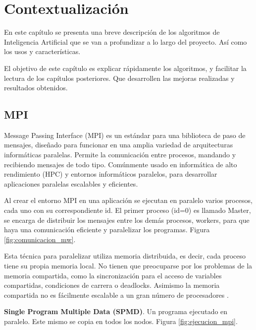 \chapter{Contextualización}
\label{cap:Contextualizacion}



En este capítulo se presenta una breve descripción de los algoritmos de Inteligencia Artificial que se van a profundizar a lo largo del proyecto. Así como los usos y características. 

El objetivo de este capítulo es explicar rápidamente los algoritmos, y facilitar la lectura de los capítulos posteriores. Que desarrollen las mejoras realizadas y resultados obtenidos.



\section{MPI}
Message Passing Interface \cite{barker2015message}  (MPI)  es un estándar para una biblioteca de paso de mensajes, diseñado para funcionar en una amplia variedad de arquitecturas informáticas paralelas. Permite la comunicación entre procesos, mandando y recibiendo mensajes de todo tipo. Comúnmente usado en informática de alto rendimiento \cite{stone1990high} (HPC) y entornos informáticos paralelos, para desarrollar aplicaciones paralelas escalables y eficientes.

Al crear el entorno MPI en una aplicación se ejecutan en paralelo varios procesos, cada uno con su correspondiente id. El primer proceso (id=0) es llamado Master, se encarga de distribuir los mensajes entre los demás procesos, workers, para que haya una comunicación eficiente y paralelizar los programas. Figura \ref{fig:comunicacion_mw}.

Esta técnica para paralelizar utiliza memoria distribuida, es decir, cada proceso tiene su propia memoria local. No tienen que preocuparse por los problemas de la memoria compartida, como la sincronización para el acceso de variables compartidas, condiciones de carrera o deadlocks. Asimismo la memoria compartida no es fácilmente escalable a un gran número de procesadores \cite{barker2015message} .


\textbf{Single Program Multiple Data (SPMD)}. Un programa ejecutado en paralelo. Este mismo se copia en todos los nodos. Figura \ref{fig:ejecucion_mpi}.


